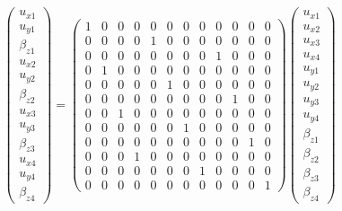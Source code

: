 \begin{equation} 
\begin{pmatrix}
u_{x1} \\
u_{y1} \\
\beta_{z1} \\
u_{x2} \\
u_{y2} \\
\beta_{z2} \\
u_{x3} \\
u_{y3} \\
\beta_{z3} \\
u_{x4} \\
u_{y4} \\
\beta_{z4} 
\end{pmatrix}
=
\begin{pmatrix}
1 & 0 & 0 & 0 & 0 & 0 & 0 & 0 & 0 & 0 & 0 & 0 \\
0 & 0 & 0 & 0 & 1 & 0 & 0 & 0 & 0 & 0 & 0 & 0 \\
0 & 0 & 0 & 0 & 0 & 0 & 0 & 0 & 1 & 0 & 0 & 0 \\
0 & 1 & 0 & 0 & 0 & 0 & 0 & 0 & 0 & 0 & 0 & 0 \\
0 & 0 & 0 & 0 & 0 & 1 & 0 & 0 & 0 & 0 & 0 & 0 \\
0 & 0 & 0 & 0 & 0 & 0 & 0 & 0 & 0 & 1 & 0 & 0 \\
0 & 0 & 1 & 0 & 0 & 0 & 0 & 0 & 0 & 0 & 0 & 0 \\
0 & 0 & 0 & 0 & 0 & 0 & 1 & 0 & 0 & 0 & 0 & 0 \\
0 & 0 & 0 & 0 & 0 & 0 & 0 & 0 & 0 & 0 & 1 & 0 \\
0 & 0 & 0 & 1 & 0 & 0 & 0 & 0 & 0 & 0 & 0 & 0 \\
0 & 0 & 0 & 0 & 0 & 0 & 0 & 1 & 0 & 0 & 0 & 0 \\
0 & 0 & 0 & 0 & 0 & 0 & 0 & 0 & 0 & 0 & 0 & 1
\end{pmatrix}
\begin{pmatrix}
u_{x1} \\
u_{x2} \\
u_{x3} \\
u_{x4} \\
u_{y1} \\
u_{y2} \\
u_{y3} \\
u_{y4} \\
\beta_{z1} \\
\beta_{z2}  \\
\beta_{z3}  \\
\beta_{z4} 
\end{pmatrix}
\label{equation18_2}
\end{equation}

